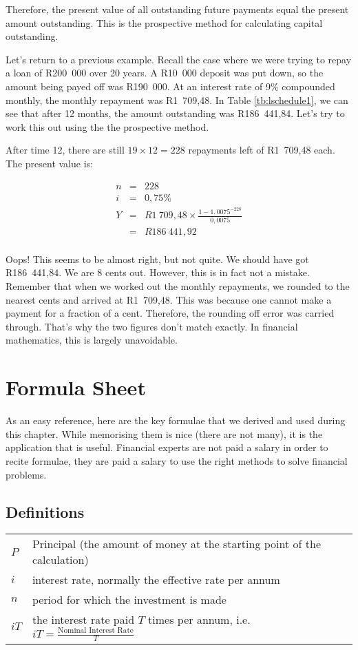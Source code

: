 Therefore, the present value of all outstanding future payments equal the present amount outstanding. This is the prospective method for calculating capital outstanding.

Let's return to a previous example. Recall the case where we were trying to repay a loan of R200~000 over 20 years. A R10~000 deposit was put down, so the amount being payed off was R190~000. At an interest rate of 9\% compounded monthly, the monthly repayment was R1~709,48. In Table \ref{tb:lschedule1}, we can see that after 12 months, the amount outstanding was R186~441,84. Let's try to work this out using the the prospective method.

After time 12, there are still $19 \times 12 = 228$ repayments left of R1~709,48 each. The present value is:

\begin{eqnarray*}
n &=& 228\\
i &=& 0,75\%\\
Y &=&R1~709,48 \times \frac{1-1,0075^{-228}}{0,0075}\\
&=& R186~441,92\\
\end{eqnarray*}

Oops! This seems to be almost right, but not quite. We should have got R186~441,84. We are 8 cents out. However, this is in fact not a mistake. Remember that when we worked out the monthly repayments, we rounded to the nearest cents and arrived at R1~709,48. This was because one cannot make a payment for a fraction of a cent. Therefore, the rounding off error was carried through. That's why the two figures don't match exactly. In financial mathematics, this is largely unavoidable.


\section{Formula Sheet}
As an easy reference, here are the key formulae that we derived and used during this chapter. While memorising them is nice (there are not many), it is the application that is useful. Financial experts are not paid a salary in order to recite formulae, they are paid a salary to use the right methods to solve financial problems.

\subsection{Definitions}
\begin{tabular}{ll}
$P$ &Principal (the amount of money at the starting point of the calculation)\\
$i$ &interest rate, normally the effective rate per annum\\
$n$ &period for which the investment is made\\
$iT$ &the interest rate paid $T$ times per annum, i.e. $iT = \frac{\mbox{Nominal Interest Rate}}{T}$
\end{tabular}

